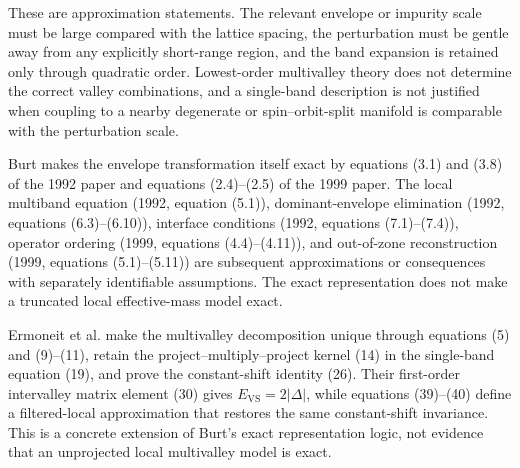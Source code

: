 These are approximation statements. The relevant envelope or impurity scale
must be large compared with the lattice spacing, the perturbation must be
gentle away from any explicitly short-range region, and the band expansion is
retained only through quadratic order. Lowest-order multivalley theory does not
determine the correct valley combinations, and a single-band description is
not justified when coupling to a nearby degenerate or spin--orbit-split manifold
is comparable with the perturbation scale.

Burt makes the envelope transformation itself exact by equations (3.1) and
(3.8) of the 1992 paper and equations (2.4)--(2.5) of the 1999 paper. The local
multiband equation (1992, equation (5.1)), dominant-envelope elimination
(1992, equations (6.3)--(6.10)), interface conditions (1992, equations
(7.1)--(7.4)), operator ordering (1999, equations (4.4)--(4.11)), and
out-of-zone reconstruction (1999, equations (5.1)--(5.11)) are subsequent
approximations or consequences with separately identifiable assumptions. The
exact representation does not make a truncated local effective-mass model
exact.

Ermoneit et al. make the multivalley decomposition unique through equations
(5) and (9)--(11), retain the project--multiply--project kernel (14) in the
single-band equation (19), and prove the constant-shift identity (26). Their
first-order intervalley matrix element (30) gives
$E_{\mathrm{VS}}=2|\Delta|$, while equations (39)--(40) define a filtered-local
approximation that restores the same constant-shift invariance. This is a
concrete extension of Burt's exact representation logic, not evidence that an
unprojected local multivalley model is exact.


